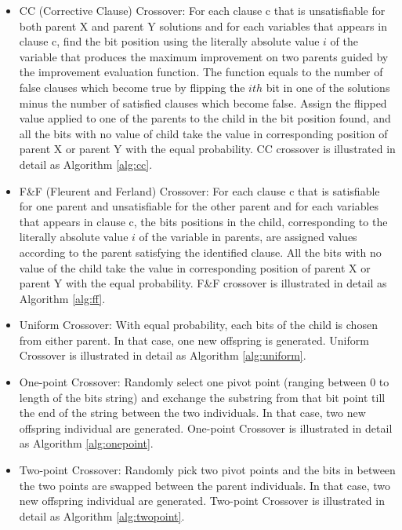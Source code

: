 	\begin{itemize}
		\item
		      CC (Corrective Clause) Crossover: For each clause c that is unsatisfiable for
		      both parent X and parent Y solutions and for each variables that appears in
		      clause c, find the bit position using the literally absolute value
		      $i$ of the variable that produces the maximum improvement on
		      two parents guided by the improvement evaluation function. The function equals
		      to the number of false clauses which become true by flipping the
		      $ith$ bit in one of the solutions minus the number of
		      satisfied clauses which become false. Assign the flipped value applied to one
		      of the parents to the child in the bit position found, and all the bits with
		      no value of child take the value in corresponding position of parent X or
		      parent Y with the equal probability. CC crossover is illustrated in detail as Algorithm \ref{alg:cc}.
			
		\item
		      F\&F (Fleurent and Ferland) Crossover: For each clause c that is satisfiable
		      for one parent and unsatisfiable for the other parent and for each variables
		      that appears in clause c, the bits positions in the child, corresponding to
		      the literally absolute value $i$ of the variable in parents,
		      are assigned values according to the parent satisfying the identified clause.
		      All the bits with no value of the child take the value in corresponding
		      position of parent X or parent Y with the equal probability. F\&F crossover is illustrated in detail as Algorithm \ref{alg:ff}.
			  
		\item
		      Uniform Crossover: With equal probability, each bits of the child is chosen
		      from either parent. In that case, one new offspring is generated. Uniform Crossover is illustrated in detail as Algorithm \ref{alg:uniform}.
			  
		\item One-point Crossover: Randomly select one pivot point (ranging between 0 to
		      length of the bits string) and exchange the substring from that bit point till
		      the end of the string between the two individuals. In that case, two new
		      offspring individual are generated. One-point Crossover is illustrated in detail as Algorithm \ref{alg:onepoint}.
		\item
		      Two-point Crossover: Randomly pick two pivot points and the bits in between
		      the two points are swapped between the parent individuals. In that case, two
		      new offspring individual are generated. Two-point Crossover is illustrated in detail as Algorithm \ref{alg:twopoint}.
			 
	\end{itemize}
